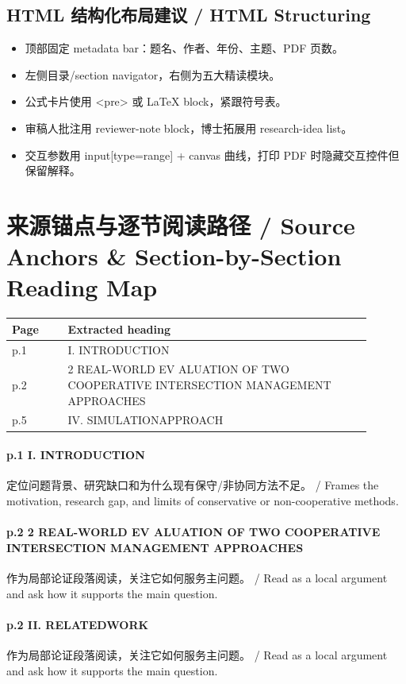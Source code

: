 \documentclass[UTF8,a4paper,11pt,fontset=fandol]{ctexart}
\begin{document}
\subsection{HTML 结构化布局建议 / HTML Structuring}
\begin{itemize}
\item 顶部固定 metadata bar：题名、作者、年份、主题、PDF 页数。
\item 左侧目录/section navigator，右侧为五大精读模块。
\item 公式卡片使用 <pre> 或 LaTeX block，紧跟符号表。
\item 审稿人批注用 reviewer-note block，博士拓展用 research-idea list。
\item 交互参数用 input[type=range] + canvas 曲线，打印 PDF 时隐藏交互控件但保留解释。
\end{itemize}


\section{来源锚点与逐节阅读路径 / Source Anchors \& Section-by-Section Reading Map}
\begin{longtable}{p{0.14\linewidth}p{0.76\linewidth}}
\toprule
Page & Extracted heading\\
\midrule
p.1 & I. INTRODUCTION \\
p.2 & 2 REAL-WORLD EV ALUATION OF TWO COOPERATIVE INTERSECTION MANAGEMENT APPROACHES \\
p.5 & IV. SIMULATIONAPPROACH \\
\bottomrule
\end{longtable}

\paragraph{p.1 I. INTRODUCTION}定位问题背景、研究缺口和为什么现有保守/非协同方法不足。 / Frames the motivation, research gap, and limits of conservative or non-cooperative methods.

\paragraph{p.2 2 REAL-WORLD EV ALUATION OF TWO COOPERATIVE INTERSECTION MANAGEMENT APPROACHES}作为局部论证段落阅读，关注它如何服务主问题。 / Read as a local argument and ask how it supports the main question.

\paragraph{p.2 II. RELATEDWORK}作为局部论证段落阅读，关注它如何服务主问题。 / Read as a local argument and ask how it supports the main question.
\end{document}
